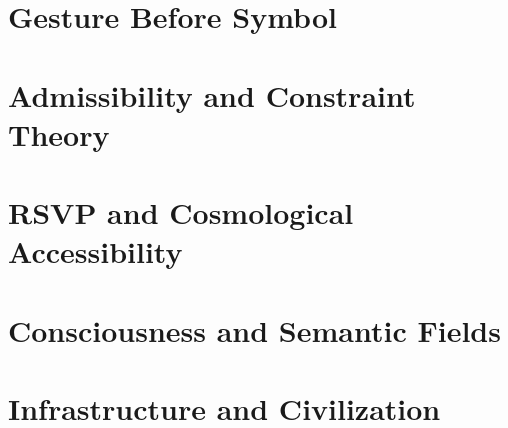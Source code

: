 \documentclass[
  12pt,
  twoside,
  openright,
  a4paper
]{book}
\begin{document}
\part{Gesture Before Symbol}





\part{Admissibility and Constraint Theory}





\part{RSVP and Cosmological Accessibility}





\part{Consciousness and Semantic Fields}




\part{Infrastructure and Civilization}



\end{document}
